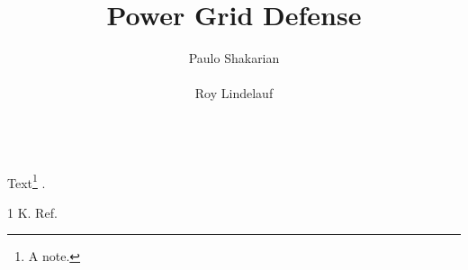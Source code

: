 \documentclass{aamas2013}
\begin{document}
\title{Power Grid Defense}
\author{\alignauthor Paulo Shakarian \\ \\ 
\alignauthor Roy Lindelauf \\ \\ }
\maketitle
Text\footnote{A note.} \cite{k}.
\begin{thebibliography}{1} K. Ref.\end{thebibliography}
\end{document}

